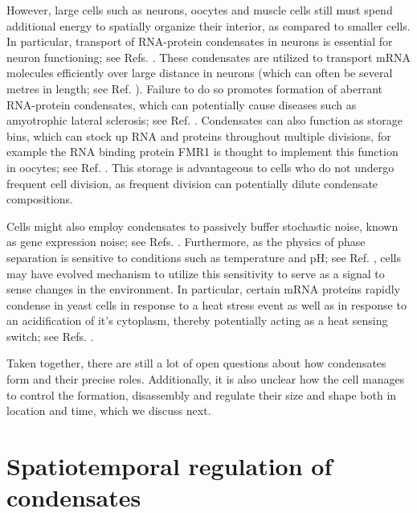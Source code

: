 However, large cells such as neurons, oocytes and muscle cells still must spend additional energy to spatially organize their interior, as compared to smaller cells.
In particular, transport of RNA-protein condensates in neurons is essential for neuron functioning; see Refs. \cite{LIAO2019147,KANAI2004513}.
These condensates are utilized to transport mRNA molecules efficiently over large distance in neurons (which can often be several metres in length; see Ref. \cite{Ishizuka1995}).
Failure to do so promotes formation of aberrant RNA-protein condensates, which can potentially cause diseases such as amyotrophic lateral sclerosis; see Ref. \cite{Altman2021}.
Condensates can also function as storage bins, which can stock up RNA and proteins throughout multiple divisions, for example the RNA binding protein FMR1 is thought to implement this function in oocytes; see Ref. \cite{Greenblatt2018}.
This storage is advantageous to cells who do not undergo frequent cell division, as frequent division can potentially dilute condensate compositions.

Cells might also employ condensates to passively buffer stochastic noise, known as gene expression noise; see Refs. \cite{Eldar2010,Klosin2020}.
Furthermore, as the physics of phase separation is sensitive to conditions such as temperature and pH; see Ref. \cite{RUFF2018,}, cells may have evolved mechanism to utilize this sensitivity to serve as a signal to sense changes in the environment.
In particular, certain mRNA proteins rapidly condense in yeast cells in response to a heat stress event as well as in response to an acidification of it's cytoplasm, thereby potentially acting as a heat sensing switch; see Refs. \cite{Bizzarri2008,Orij2011,Munder2016}.

Taken together, there are still a lot of open questions about how condensates form and their precise roles.
Additionally, it is also unclear how the cell manages to control the formation, disassembly and regulate their size and shape both in location and time, which we discuss next.

\section{Spatiotemporal regulation of condensates}

